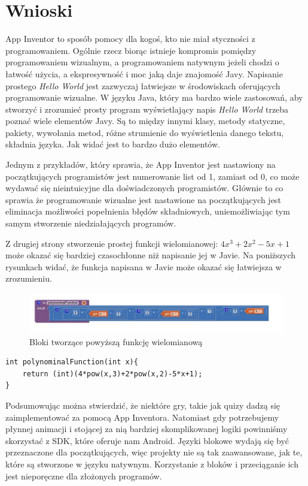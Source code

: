 \chapter{Wnioski}
\label{c6}

App Inventor to sposób pomocy dla kogoś, kto nie miał styczności z programowaniem. Ogólnie rzecz biorąc istnieje kompromis pomiędzy programowaniem wizualnym, a programowaniem natywnym jeżeli chodzi o łatwość użycia, a ekspresywność i moc jaką daje znajomość Javy. Napisanie prostego \emph{Hello World} jest zazwyczaj łatwiejsze w środowiskach oferujących programowanie wizualne. W języku Java, który ma bardzo wiele zastosowań, aby stworzyć i zrozumieć prosty program wyświetlający napis \emph{Hello World} trzeba poznać wiele elementów Javy. Są to między innymi klasy, metody statyczne, pakiety, wywołania metod, różne strumienie do wyświetlenia danego tekstu, składnia języka. Jak widać jest to bardzo dużo elementów. 

Jednym z przykładów, który sprawia, że App Inventor jest nastawiony na początkujących programistów jest numerowanie list od 1, zamiast od 0, co może wydawać się nieintuicyjne dla doświadczonych programistów. Głównie to co sprawia że programowanie wizualne jest nastawione na początkujących jest eliminacja możliwości popełnienia błędów składniowych, uniemożliwiając tym samym stworzenie niedziałających programów. 

Z drugiej strony stworzenie prostej funkcji wielomianowej: $4x^3+2x^2-5x+1$ może okazać się bardziej czasochłonne niż napisanie jej w Javie. 
Na poniższych rysunkach widać, że funkcja napisana w Javie może okazać się łatwiejsza w zrozumieniu.


\begin{figure}[H]
\centering\includegraphics[width=15cm]{figures/polynominalFunction}
\caption{Bloki tworzące powyższą funkcję wielomianową}
\end{figure}

\begin{lstlisting}
int polynominalFunction(int x){
	return (int)(4*pow(x,3)+2*pow(x,2)-5*x+1);
}
\end{lstlisting}


Podsumowując można stwierdzić, że niektóre gry, takie jak quizy dadzą się zaimplementować za pomocą App Inventora. Natomiast gdy potrzebujemy płynnej animacji i stojącej za nią bardziej skomplikowanej logiki powinniśmy skorzystać z SDK, które oferuje nam Android. Języki blokowe wydają się być przeznaczone dla początkujących, więc projekty nie są tak zaawansowane, jak te, które są stworzone w języku natywnym. Korzystanie z bloków i przeciąganie ich jest nieporęczne dla złożonych programów.


